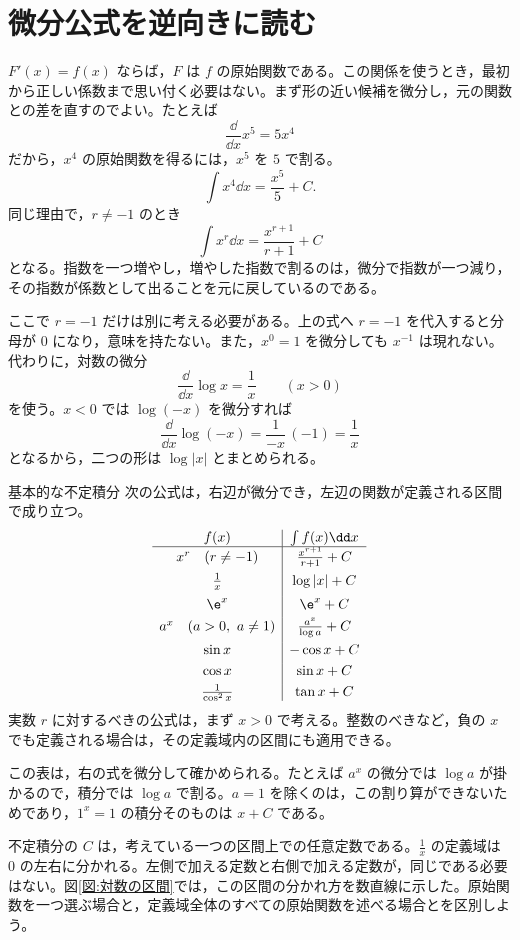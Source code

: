 \section{微分公式を逆向きに読む}\label{節:基本公式の逆}

$F'(x)=f(x)$ ならば，$F$ は $f$ の原始関数である。この関係を使うとき，最初から正しい係数まで思い付く必要はない。まず形の近い候補を微分し，元の関数との差を直すのでよい。たとえば
\[
 \frac{\dd}{\dd x}x^5=5x^4
\]
だから，$x^4$ の原始関数を得るには，$x^5$ を $5$ で割る。
\[
 \int x^4\dd x=\frac{x^5}{5}+C.
\]
同じ理由で，$r\ne-1$ のとき
\[
 \int x^r\dd x=\frac{x^{r+1}}{r+1}+C
\]
となる。指数を一つ増やし，増やした指数で割るのは，微分で指数が一つ減り，その指数が係数として出ることを元に戻しているのである。

ここで $r=-1$ だけは別に考える必要がある。上の式へ $r=-1$ を代入すると分母が $0$ になり，意味を持たない。また，$x^0=1$ を微分しても $x^{-1}$ は現れない。代わりに，対数の微分
\[
 \frac{\dd}{\dd x}\log x=\frac1x\qquad(x>0)
\]
を使う。$x<0$ では $\log(-x)$ を微分すれば
\[
 \frac{\dd}{\dd x}\log(-x)
 =\frac1{-x}\,(-1)=\frac1x
\]
となるから，二つの形は $\log|x|$ とまとめられる。

\begin{theorem}{基本的な不定積分}
次の公式は，右辺が微分でき，左辺の関数が定義される区間で成り立つ。
\[
\begin{array}{c|c}
 f(x)&\int f(x)\dd x\\ \hline
 x^r\quad(r\ne-1)&\frac{x^{r+1}}{r+1}+C\\[5pt]
 \frac1x&\log|x|+C\\[5pt]
 \e^x&\e^x+C\\[3pt]
 a^x\quad(a>0,\ a\ne1)&\frac{a^x}{\log a}+C\\[5pt]
 \sin x&-\cos x+C\\[3pt]
 \cos x&\sin x+C\\[3pt]
 \frac1{\cos^2x}&\tan x+C
\end{array}
\]
実数 $r$ に対するべきの公式は，まず $x>0$ で考える。整数のべきなど，負の $x$ でも定義される場合は，その定義域内の区間にも適用できる。
\end{theorem}

この表は，右の式を微分して確かめられる。たとえば $a^x$ の微分では $\log a$ が掛かるので，積分では $\log a$ で割る。$a=1$ を除くのは，この割り算ができないためであり，$1^x=1$ の積分そのものは $x+C$ である。

不定積分の $C$ は，考えている一つの区間上での任意定数である。$\frac1x$ の定義域は $0$ の左右に分かれる。左側で加える定数と右側で加える定数が，同じである必要はない。図\ref{図:対数の区間}では，この区間の分かれ方を数直線に示した。原始関数を一つ選ぶ場合と，定義域全体のすべての原始関数を述べる場合とを区別しよう。

